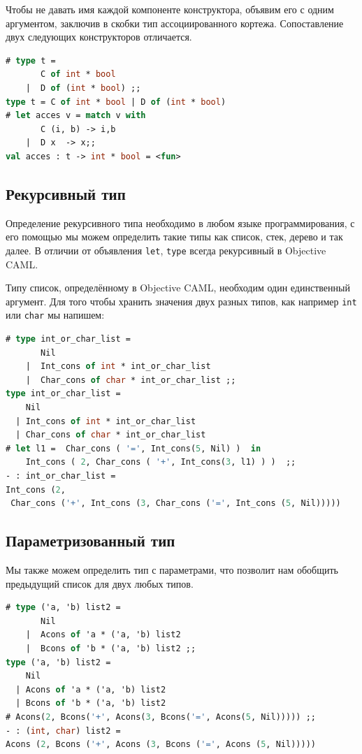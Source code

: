 Чтобы не давать имя каждой компоненте конструктора, объявим его с одним
аргументом, заключив в скобки тип ассоциированного кортежа. Сопоставление двух
следующих конструкторов отличается.

\begin{lstlisting}[language=OCaml]
# type t =
       C of int * bool
    |  D of (int * bool) ;;
type t = C of int * bool | D of (int * bool)
# let acces v = match v with
       C (i, b) -> i,b
    |  D x  -> x;;
val acces : t -> int * bool = <fun>
\end{lstlisting}

\subsection{Рекурсивный тип}

 Определение рекурсивного типа необходимо в любом языке программирования, с его
помощью мы можем определить такие типы как список, стек, дерево и так далее. В
отличии от объявления \texttt{let}, \texttt{type} всегда рекурсивный в Objective
CAML.

Типу список, определённому в Objective CAML, необходим один единственный
аргумент. Для того чтобы хранить значения двух разных типов, как например
\texttt{int} или \texttt{char} мы напишем:

\begin{lstlisting}[language=OCaml]
# type int_or_char_list =
       Nil
    |  Int_cons of int * int_or_char_list
    |  Char_cons of char * int_or_char_list ;;
type int_or_char_list =
    Nil
  | Int_cons of int * int_or_char_list
  | Char_cons of char * int_or_char_list
# let l1 =  Char_cons ( '=', Int_cons(5, Nil) )  in
    Int_cons ( 2, Char_cons ( '+', Int_cons(3, l1) ) )  ;;
- : int_or_char_list =
Int_cons (2,
 Char_cons ('+', Int_cons (3, Char_cons ('=', Int_cons (5, Nil)))))
\end{lstlisting}

\subsection{Параметризованный тип}
\label{sec:parametrized_types}

Мы также можем определить тип с параметрами, что позволит нам обобщить
предыдущий список для двух любых типов.

\begin{lstlisting}[language=OCaml]
# type ('a, 'b) list2 =
       Nil
    |  Acons of 'a * ('a, 'b) list2
    |  Bcons of 'b * ('a, 'b) list2 ;;
type ('a, 'b) list2 =
    Nil
  | Acons of 'a * ('a, 'b) list2
  | Bcons of 'b * ('a, 'b) list2
# Acons(2, Bcons('+', Acons(3, Bcons('=', Acons(5, Nil))))) ;;
- : (int, char) list2 =
Acons (2, Bcons ('+', Acons (3, Bcons ('=', Acons (5, Nil)))))
\end{lstlisting}

